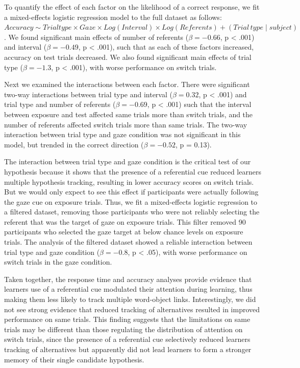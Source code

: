 \documentclass[a4paper,man,natbib]{apa6}
\begin{document}
To quantify the effect of each factor on the likelihood of a correct
response, we fit a mixed-effects logistic regression model to the full
dataset as follows:
\(Accuracy \sim Trial type \times Gaze \times Log(Interval) \times Log(Referents) + (Trial \, type \mid subject)\).
We found significant main effects of number of referents
(\(\beta = -0.66\), p \textless{} .001) and interval (\(\beta = -0.49\),
p \textless{} .001), such that as each of these factors increased,
accuracy on test trials decreased. We also found significant main
effects of trial type (\(\beta = -1.3\), p \textless{} .001), with worse
performance on switch trials.

Next we examined the interactions between each factor. There were
significant two-way interactions between trial type and interval
(\(\beta = 0.32\), p \textless{} .001) and trial type and number of
referents (\(\beta = -0.69\), p \textless{} .001) such that the interval
between exposure and test affected same trials more than switch trials,
and the number of referents affected switch trials more than same
trials. The two-way interaction between trial type and gaze condition
was not significant in this model, but trended in the correct direction
(\(\beta = -0.52\), p = 0.13).

The interaction between trial type and gaze condition is the critical
test of our hypothesis because it shows that the presence of a
referential cue reduced learners multiple hypothesis tracking, resulting
in lower accuracy scores on switch trials. But we would only expect to
see this effect if participants were actually following the gaze cue on
exposure trials. Thus, we fit a mixed-effects logistic regression to a
filtered dataset, removing those participants who were not reliably
selecting the referent that was the target of gaze on exposure trials.
This filter removed 90 participants who selected the gaze target at
below chance levels on exposure trials. The analysis of the filtered
dataset showed a reliable interaction between trial type and gaze
condition (\(\beta = -0.8\), p \textless{} .05), with worse performance
on switch trials in the gaze condition.

Taken together, the response time and accuracy analyses provide evidence
that learners use of a referential cue modulated their attention during
learning, thus making them less likely to track multiple word-object
links. Interestingly, we did not see strong evidence that reduced
tracking of alternatives resulted in improved performance on same
trials. This finding suggests that the limitations on same trials may be
different than those regulating the distribution of attention on switch
trials, since the presence of a referential cue selectively reduced
learners tracking of alternatives but apparently did not lead learners
to form a stronger memory of their single candidate hypothesis.
\end{document}
